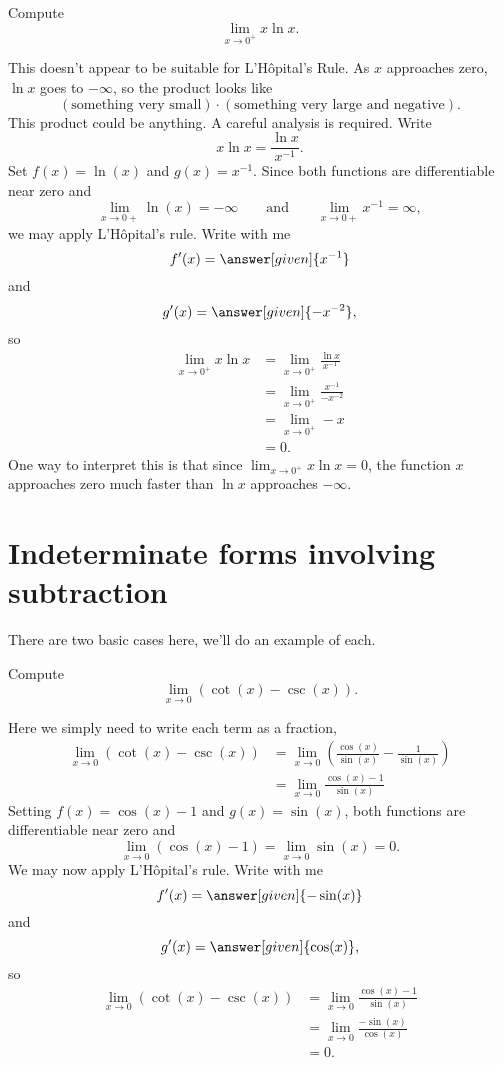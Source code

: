 \documentclass{ximera}
\begin{document}
\begin{example}\label{example:xlnx infty} 
Compute 
\[
\lim_{x\to 0^+} x\ln x.
\]
\begin{explanation}
This doesn't appear to be suitable for L'H\^{o}pital's Rule. As $x$
approaches zero, $\ln x$ goes to $-\infty$, so the product looks like
\[
(\text{something very small})\cdot (\text{something very large and
  negative}).
\] 
This product could be anything. A careful analysis is required.
Write
\[
x\ln x = \frac{\ln x}{x^{-1}}.
\]
Set $f(x) = \ln(x)$ and $g(x) = x^{-1}$.  Since both functions are differentiable near zero and 
\[
\lim_{x\to 0+} \ln(x) = -\infty\qquad\text{and}\qquad \lim_{x\to 0+} x^{-1} = \infty,
\]
we may apply L'H\^{o}pital's rule. Write with me
\[
f'(x) = \answer[given]{x^{-1}}
\]
and
\[
g'(x) = \answer[given]{-x^{-2}},
\]
so
\begin{align*}
  \lim_{x\to 0^+} x\ln x &= \lim_{x\to 0^+} \frac{\ln x}{x^{-1}} \\
  &= \lim_{x\to 0^+} \frac{x^{-1}}{-x^{-2}}\\
  &=\lim_{x\to 0^+} -x \\
  &= 0.
\end{align*}
One way to interpret this is that since $\lim_{x\to 0^+}x\ln x = 0$,
the function $x$ approaches zero much faster than $\ln x$ approaches
$-\infty$.
\end{explanation}
\end{example}


\section{Indeterminate forms involving subtraction}

There are two basic cases here, we'll do an example of each.

\begin{example}
Compute
\[
\lim_{x\to 0} \left(\cot(x) - \csc(x)\right).
\]
\begin{explanation}
Here we simply need to write each term as a fraction,
\begin{align*}
\lim_{x\to 0} \left(\cot(x) - \csc(x)\right) &= \lim_{x\to 0} \left(\frac{\cos(x)}{\sin(x)} - \frac{1}{\sin(x)}\right)\\
&= \lim_{x\to 0} \frac{\cos(x)-1}{\sin(x)} 
\end{align*}
Setting $f(x) = \cos(x)-1$ and $g(x)=\sin(x)$, both functions are differentiable near zero and 
\[
\lim_{x\to 0}(\cos(x)-1)=\lim_{x\to 0}\sin(x) = 0.
\]
We may now apply L'H\^{o}pital's rule. Write with me
\[
f'(x) = \answer[given]{-\sin(x)}
\]
and
\[
g'(x) = \answer[given]{\cos(x)},
\]
so
\begin{align*}
  \lim_{x\to 0} \left(\cot(x) - \csc(x)\right) &= \lim_{x\to 0} \frac{\cos(x)-1}{\sin(x)}\\
  &= \lim_{x\to 0} \frac{-\sin(x)}{\cos(x)} \\
  &=0.
\end{align*}
\end{explanation}
\end{example}
\end{document}
